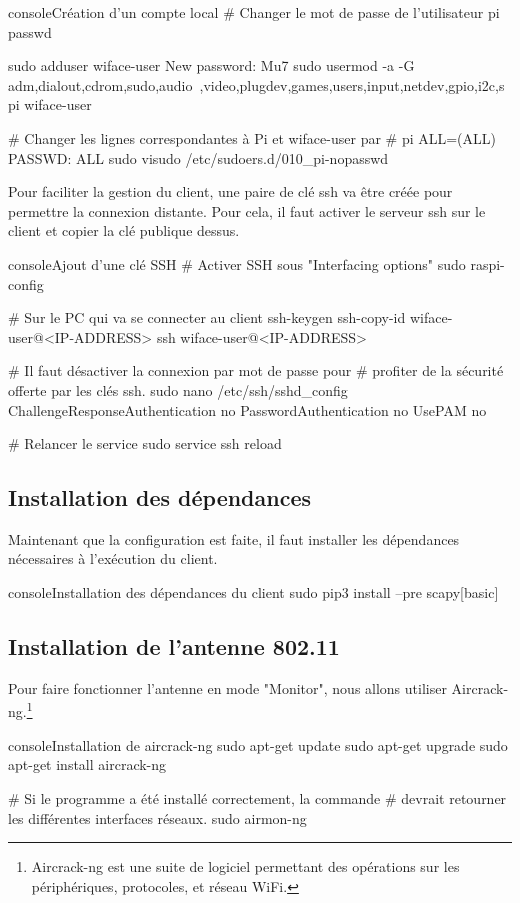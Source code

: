 \begin{listingsbox}{console}{Création d'un compte local}
# Changer le mot de passe de l'utilisateur pi
passwd

sudo adduser wiface-user
New password: Mu7%
sudo usermod -a -G adm,dialout,cdrom,sudo,audio\
,video,plugdev,games,users,input,netdev,gpio,i2c,spi wiface-user

# Changer les lignes correspondantes à Pi et wiface-user par 
# pi ALL=(ALL) PASSWD: ALL
sudo visudo /etc/sudoers.d/010_pi-nopasswd
\end{listingsbox}

Pour faciliter la gestion du client, une paire de clé ssh va être créée pour permettre la connexion distante.
Pour cela, il faut activer le serveur ssh sur le client et copier la clé publique dessus.

\begin{listingsbox}{console}{Ajout d'une clé SSH}
    # Activer SSH sous "Interfacing options"
    sudo raspi-config

    # Sur le PC qui va se connecter au client
    ssh-keygen
    ssh-copy-id wiface-user@<IP-ADDRESS>
    ssh wiface-user@<IP-ADDRESS>

    # Il faut désactiver la connexion par mot de passe pour
    # profiter de la sécurité offerte par les clés ssh.
    sudo nano /etc/ssh/sshd_config
    ChallengeResponseAuthentication no
    PasswordAuthentication no
    UsePAM no

    # Relancer le service
    sudo service ssh reload
\end{listingsbox}

\subsection{Installation des dépendances}
Maintenant que la configuration est faite, il faut installer les dépendances
nécessaires à l'exécution du client. 

\begin{listingsbox}{console}{Installation des dépendances du client}
    sudo pip3 install --pre scapy[basic]
    
\end{listingsbox}


\subsection{Installation de l'antenne 802.11}
Pour faire fonctionner l'antenne en mode "Monitor", nous allons utiliser Aircrack-ng.\footnote{Aircrack-ng est une suite de logiciel permettant des opérations sur les périphériques, protocoles, et réseau WiFi.}
\begin{listingsbox}{console}{Installation de aircrack-ng}
sudo apt-get update
sudo apt-get upgrade
sudo apt-get install aircrack-ng

# Si le programme a été installé correctement, la commande
# devrait retourner les différentes interfaces réseaux.
sudo airmon-ng
\end{listingsbox}

